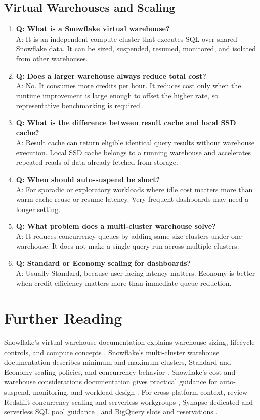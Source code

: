 \subsection{Virtual Warehouses and Scaling}
\begin{enumerate}
    \item \textbf{Q: What is a Snowflake virtual warehouse?}\\
    A: It is an independent compute cluster that executes SQL over shared Snowflake data. It can be sized, suspended, resumed, monitored, and isolated from other warehouses.
    \item \textbf{Q: Does a larger warehouse always reduce total cost?}\\
    A: No. It consumes more credits per hour. It reduces cost only when the runtime improvement is large enough to offset the higher rate, so representative benchmarking is required.
    \item \textbf{Q: What is the difference between result cache and local SSD cache?}\\
    A: Result cache can return eligible identical query results without warehouse execution. Local SSD cache belongs to a running warehouse and accelerates repeated reads of data already fetched from storage.
    \item \textbf{Q: When should auto-suspend be short?}\\
    A: For sporadic or exploratory workloads where idle cost matters more than warm-cache reuse or resume latency. Very frequent dashboards may need a longer setting.
    \item \textbf{Q: What problem does a multi-cluster warehouse solve?}\\
    A: It reduces concurrency queues by adding same-size clusters under one warehouse. It does not make a single query run across multiple clusters.
    \item \textbf{Q: Standard or Economy scaling for dashboards?}\\
    A: Usually Standard, because user-facing latency matters. Economy is better when credit efficiency matters more than immediate queue reduction.
\end{enumerate}

\section{Further Reading}
Snowflake's virtual warehouse documentation explains warehouse sizing, lifecycle controls, and compute concepts \cite{snowflakeVirtualWarehouseDocs,snowflakeWarehouseOverviewDocs}. Snowflake's multi-cluster warehouse documentation describes minimum and maximum clusters, Standard and Economy scaling policies, and concurrency behavior \cite{snowflakeMultiClusterDocs}. Snowflake's cost and warehouse considerations documentation gives practical guidance for auto-suspend, monitoring, and workload design \cite{snowflakeWarehouseConsiderationsDocs,snowflakeCostManagementDocs}. For cross-platform context, review Redshift concurrency scaling and serverless workgroups \cite{awsRedshiftConcurrencyScalingDocs}, Synapse dedicated and serverless SQL pool guidance \cite{azureSynapseSqlDocs}, and BigQuery slots and reservations \cite{googleBigQuerySlotsDocs}.

